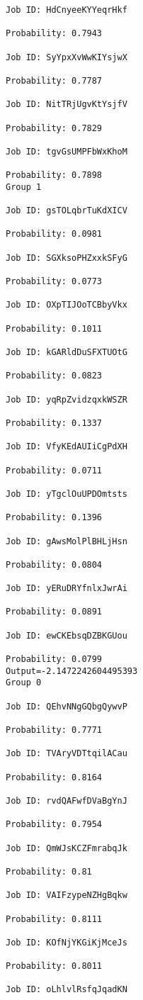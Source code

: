 \documentclass[11pt]{article}
\begin{document}
\begin{Verbatim}[commandchars=\\\{\}]
Job ID: HdCnyeeKYYeqrHkf

Probability: 0.7943

Job ID: SyYpxXvWwKIYsjwX

Probability: 0.7787

Job ID: NitTRjUgvKtYsjfV

Probability: 0.7829

Job ID: tgvGsUMPFbWxKhoM

Probability: 0.7898
Group 1

Job ID: gsTOLqbrTuKdXICV

Probability: 0.0981

Job ID: SGXksoPHZxxkSFyG

Probability: 0.0773

Job ID: OXpTIJOoTCBbyVkx

Probability: 0.1011

Job ID: kGARldDuSFXTUOtG

Probability: 0.0823

Job ID: yqRpZvidzqxkWSZR

Probability: 0.1337

Job ID: VfyKEdAUIiCgPdXH

Probability: 0.0711

Job ID: yTgclOuUPDOmtsts

Probability: 0.1396

Job ID: gAwsMolPlBHLjHsn

Probability: 0.0804

Job ID: yERuDRYfnlxJwrAi

Probability: 0.0891

Job ID: ewCKEbsqDZBKGUou

Probability: 0.0799
Output=-2.1472242604495393
Group 0

Job ID: QEhvNNgGQbgQywvP

Probability: 0.7771

Job ID: TVAryVDTtqilACau

Probability: 0.8164

Job ID: rvdQAFwfDVaBgYnJ

Probability: 0.7954

Job ID: QmWJsKCZFmrabqJk

Probability: 0.81

Job ID: VAIFzypeNZHgBqkw

Probability: 0.8111

Job ID: KOfNjYKGiKjMceJs

Probability: 0.8011

Job ID: oLhlvlRsfqJqadKN


\end{Verbatim}
\end{document}
